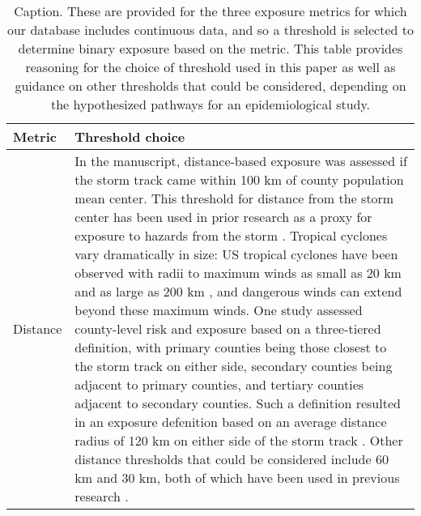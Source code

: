 \begin{table}
\caption{Caption. These are provided for the three exposure metrics for which our database includes continuous data, and so a threshold is selected to determine binary exposure based on the metric. This table provides reasoning for the choice of threshold used in this paper as well as guidance on other thresholds that could be considered, depending on the hypothesized pathways for an epidemiological study.}
\label{tab:thresholds}
\centering
\begin{tabular}{lp{40em}}
\toprule
Metric & Threshold choice\\
\midrule
Distance & In the manuscript, distance-based exposure was assessed if the storm track came within 100 km of county population mean center. This threshold for distance from the storm center has been used in prior research as a proxy for exposure to hazards from the storm \cite{grabich2015measuring}. Tropical cyclones vary dramatically in size: US tropical cyclones have been observed with radii to maximum winds as small as 20 km and as large as 200 km \cite{mallin2006, quiring2011variations}, and dangerous winds can extend beyond these maximum winds. One study \cite{czajkowski2011} assessed county-level risk and exposure based on a three-tiered definition, with primary counties being those closest to the storm track on either side, secondary counties being adjacent to primary counties, and tertiary counties adjacent to secondary counties. Such a definition resulted in an exposure defenition based on an average distance radius of 120 km on either side of the storm track \cite{czajkowski2011}. Other distance thresholds that could be considered include 60 km and 30 km, both of which have been used in previous research \cite{grabich2015measuring, grabich2015, currie2013}.\\

\end{tabular}
\end{table}
